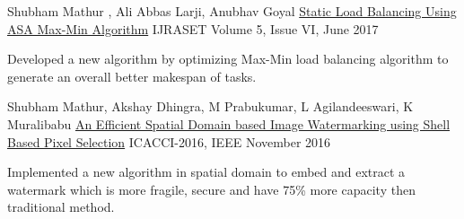 \vspace{-0.5mm}
\begin{cventries}
  \cventry
    {Shubham Mathur , Ali Abbas Larji, Anubhav Goyal}
    {\href{http://ieeexplore.ieee.org/document/7732468/}{Static Load Balancing Using ASA Max-Min Algorithm}}
    {IJRASET}
    { Volume 5, Issue VI, June 2017}
    {  \begin{justify}
        {\vspace{-4.5mm}
        \small Developed a new algorithm by optimizing Max-Min load balancing algorithm to generate an overall better makespan of tasks.
        }\end{justify}
    }
  \cventry
    {Shubham Mathur, Akshay Dhingra, M Prabukumar, L Agilandeeswari, K Muralibabu}
    {\href{http://ieeexplore.ieee.org/document/7732468/}{An Efficient Spatial Domain based Image Watermarking using Shell Based Pixel Selection} }
    {ICACCI-2016, IEEE}
    {November 2016}
    {\begin{justify}
      {\vspace{-2mm}
      \small Implemented a new algorithm in spatial domain to embed and extract a watermark which is more fragile, secure and have 75\% more capacity then traditional method.
      }\end{justify}
    }     
\end{cventries}
